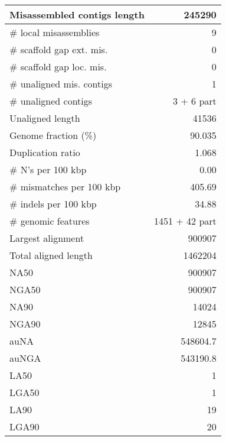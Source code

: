 \documentclass[12pt,a4paper]{article}
\begin{document}
\begin{table}[ht]
\begin{center}
\begin{tabular}{|l*{1}{|r}|}
Misassembled contigs length & 245290 \\ \hline
\# local misassemblies & 9 \\ \hline
\# scaffold gap ext. mis. & 0 \\ \hline
\# scaffold gap loc. mis. & 0 \\ \hline
\# unaligned mis. contigs & 1 \\ \hline
\# unaligned contigs & 3 + 6 part \\ \hline
Unaligned length & 41536 \\ \hline
Genome fraction (\%) & 90.035 \\ \hline
Duplication ratio & 1.068 \\ \hline
\# N's per 100 kbp & 0.00 \\ \hline
\# mismatches per 100 kbp & 405.69 \\ \hline
\# indels per 100 kbp & 34.88 \\ \hline
\# genomic features & 1451 + 42 part \\ \hline
Largest alignment & 900907 \\ \hline
Total aligned length & 1462204 \\ \hline
NA50 & 900907 \\ \hline
NGA50 & 900907 \\ \hline
NA90 & 14024 \\ \hline
NGA90 & 12845 \\ \hline
auNA & 548604.7 \\ \hline
auNGA & 543190.8 \\ \hline
LA50 & 1 \\ \hline
LGA50 & 1 \\ \hline
LA90 & 19 \\ \hline
LGA90 & 20 \\ \hline
\end{tabular}
\end{center}
\end{table}
\end{document}
